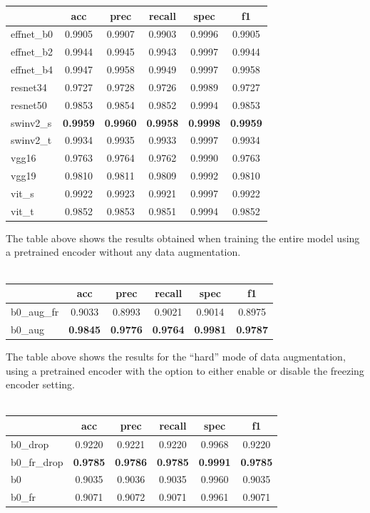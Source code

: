 \documentclass[10pt,twocolumn,letterpaper]{article}
\begin{document}
\begin{tabularx}{\columnwidth}{lccccc}
	\toprule
	 & acc & prec & recall & spec & f1 \\
	\midrule
	effnet\_b0 & 0.9905 & 0.9907 & 0.9903 & 0.9996 & 0.9905 \\
	effnet\_b2 & 0.9944 & 0.9945 & 0.9943 & 0.9997 & 0.9944 \\
	effnet\_b4 & 0.9947 & 0.9958 & 0.9949 & 0.9997 & 0.9958 \\
	resnet34 & 0.9727 & 0.9728 & 0.9726 & 0.9989 & 0.9727 \\
	resnet50 & 0.9853 & 0.9854 & 0.9852 & 0.9994 & 0.9853 \\
	swinv2\_s & \textbf{0.9959} & \textbf{0.9960} & \textbf{0.9958} & \textbf{0.9998} & \textbf{0.9959} \\
	swinv2\_t & 0.9934 & 0.9935 & 0.9933 & 0.9997 & 0.9934 \\
	vgg16 & 0.9763 & 0.9764 & 0.9762 & 0.9990 & 0.9763 \\
	vgg19 & 0.9810 & 0.9811 & 0.9809 & 0.9992 & 0.9810 \\
	vit\_s & 0.9922 & 0.9923 & 0.9921 & 0.9997 & 0.9922 \\
	vit\_t & 0.9852 & 0.9853 & 0.9851 & 0.9994 & 0.9852 \\
	\bottomrule
\end{tabularx}
The table above shows the results obtained when training the entire model using a pretrained encoder without any data augmentation.
~\\
~\\
\begin{tabularx}{\columnwidth}{lccccc}
	\toprule
	 & acc & prec & recall & spec & f1 \\
	\midrule
	b0\_aug\_fr & 0.9033 & 0.8993 & 0.9021 & 0.9014 & 0.8975 \\
	b0\_aug & \textbf{0.9845} & \textbf{0.9776} & \textbf{0.9764} & \textbf{0.9981} & \textbf{0.9787} \\
	\bottomrule
	\end{tabularx}	
The table above shows the results for the ``hard'' mode of data augmentation, using a pretrained encoder with the option to either enable or disable the freezing encoder setting.
~\\
~\\
\begin{tabularx}{\columnwidth}{lccccc}
	\toprule
	 & acc & prec & recall & spec & f1 \\
	\midrule
	b0\_drop & 0.9220 & 0.9221 & 0.9220 & 0.9968 & 0.9220 \\
	b0\_fr\_drop & \textbf{0.9785} & \textbf{0.9786} & \textbf{0.9785} & \textbf{0.9991} & \textbf{0.9785} \\
	b0 & 0.9035 & 0.9036 & 0.9035 & 0.9960 & 0.9035 \\
	b0\_fr & 0.9071 & 0.9072 & 0.9071 & 0.9961 & 0.9071 \\
	\bottomrule
	\end{tabularx}	
\end{document}
